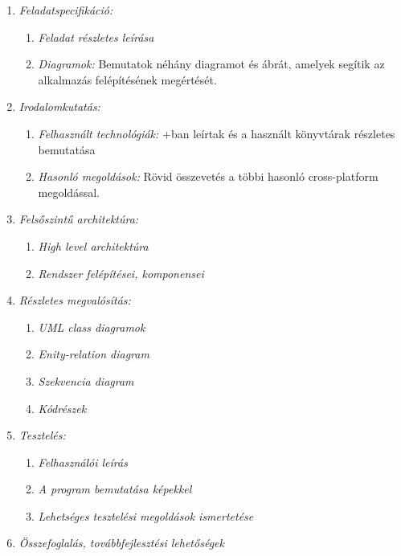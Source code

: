 \begin{enumerate}
	\item \emph{Feladatspecifikáció:}
        \begin{enumerate}
            \item \emph{Feladat részletes leírása}
            \item \emph{Diagramok:} Bemutatok néhány diagramot és ábrát, amelyek segítik az alkalmazás felépítésének megértését.
        \end{enumerate}
	\item \emph{Irodalomkutatás:} 
        \begin{enumerate}
            \item \emph{Felhasznált technológiák:} \az+ban leírtak és a használt könyvtárak részletes bemutatása 
            \item \emph{Hasonló megoldások:} Rövid összevetés a többi hasonló cross-platform megoldással.
        \end{enumerate}
    \item \emph{Felsőszintű architektúra:} 
        \begin{enumerate}
            \item \emph{High level architektúra} 
            \item \emph{Rendszer felépítései, komponensei}
        \end{enumerate}
    \item \emph{Részletes megvalósítás:} 
        \begin{enumerate}
            \item \emph{UML class diagramok} 
            \item \emph{Enity-relation diagram}
            \item \emph{Szekvencia diagram}
            \item \emph{Kódrészek}
        \end{enumerate}
    \item \emph{Tesztelés:} 
        \begin{enumerate}
            \item \emph{Felhasználói leírás} 
            \item \emph{A program bemutatása képekkel} 
            \item \emph{Lehetséges tesztelési megoldások ismertetése}
        \end{enumerate}
    \item \emph{Összefoglalás, továbbfejlesztési lehetőségek} 
\end{enumerate}